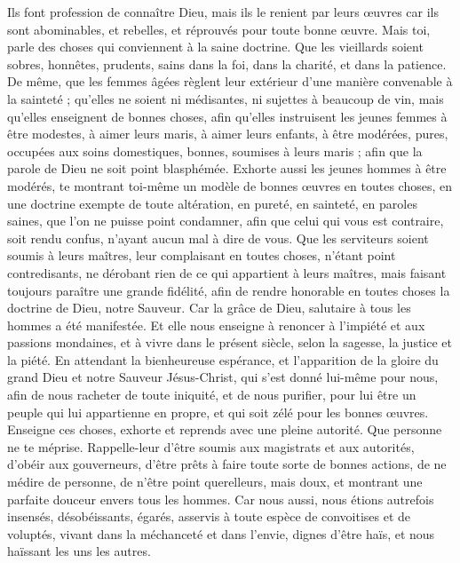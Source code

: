 \begin{multicols}{2}
Ils font profession de connaître Dieu, mais ils le renient par leurs œuvres car ils sont abominables, et rebelles, et réprouvés pour toute bonne œuvre.
\VerseOne{}Mais toi, parle des choses qui conviennent à la saine doctrine.
Que les vieillards soient sobres, honnêtes, prudents, sains dans la foi, dans la charité, et dans la patience.
De même, que les femmes âgées règlent leur extérieur d'une manière convenable à la sainteté ; qu'elles ne soient ni médisantes, ni sujettes à beaucoup de vin, mais qu'elles enseignent de bonnes choses,
afin qu'elles instruisent les jeunes femmes à être modestes, à aimer leurs maris, à aimer leurs enfants,
à être modérées, pures, occupées aux soins domestiques, bonnes, soumises à leurs maris ; afin que la parole de Dieu ne soit point blasphémée.
Exhorte aussi les jeunes hommes à être modérés,
te montrant toi-même un modèle de bonnes œuvres en toutes choses, en une doctrine exempte de toute altération, en pureté, en sainteté,
en paroles saines, que l'on ne puisse point condamner, afin que celui qui vous est contraire, soit rendu confus, n'ayant aucun mal à dire de vous.
Que les serviteurs soient soumis à leurs maîtres, leur complaisant en toutes choses, n'étant point contredisants,
ne dérobant rien de ce qui appartient à leurs maîtres, mais faisant toujours paraître une grande fidélité, afin de rendre honorable en toutes choses la doctrine de Dieu, notre Sauveur.
Car la grâce de Dieu, salutaire à tous les hommes a été manifestée.
Et elle nous enseigne à renoncer à l'impiété et aux passions mondaines, et à vivre dans le présent siècle, selon la sagesse, la justice et la piété.
En attendant la bienheureuse espérance, et l'apparition de la gloire du grand Dieu et notre Sauveur Jésus-Christ,
qui s'est donné lui-même pour nous, afin de nous racheter de toute iniquité, et de nous purifier, pour lui être un peuple qui lui appartienne en propre, et qui soit zélé pour les bonnes œuvres.
Enseigne ces choses, exhorte et reprends avec une pleine autorité. Que personne ne te méprise.
\VerseOne{}Rappelle-leur d'être soumis aux magistrats et aux autorités, d'obéir aux gouverneurs, d'être prêts à faire toute sorte de bonnes actions,
de ne médire de personne, de n'être point querelleurs, mais doux, et montrant une parfaite douceur envers tous les hommes.
Car nous aussi, nous étions autrefois insensés, désobéissants, égarés, asservis à toute espèce de convoitises et de voluptés, vivant dans la méchanceté et dans l'envie, dignes d'être haïs, et nous haïssant les uns les autres.

\end{multicols}

